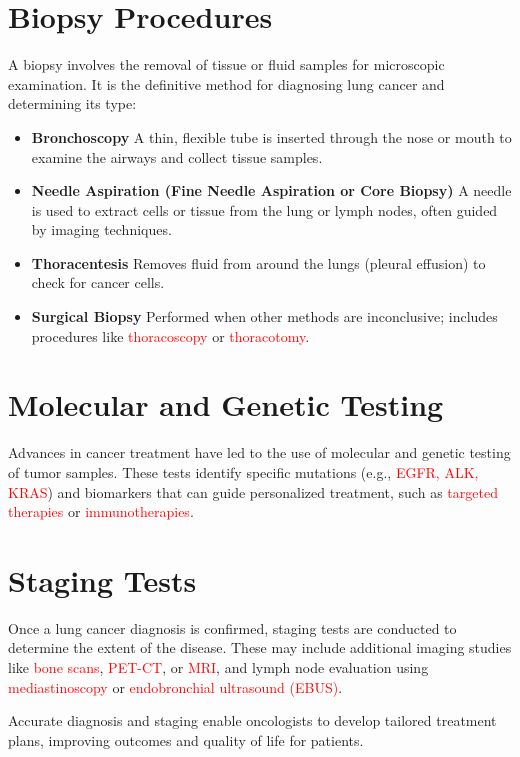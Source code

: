 \section{Biopsy Procedures} 
A biopsy involves the removal of tissue or fluid samples for microscopic examination. It is the definitive method for diagnosing lung cancer and determining its type:

\begin{highlight}
\begin{itemize}
    \item \textbf{Bronchoscopy} \cite{rozman2024interventional}A thin, flexible tube is inserted through the nose or mouth to examine the airways and collect tissue samples.
    \item \textbf{Needle Aspiration (Fine Needle Aspiration or Core Biopsy)} \cite{lee2024additional} A needle is used to extract cells or tissue from the lung or lymph nodes, often guided by imaging techniques.
    \item \textbf{Thoracentesis} \cite{dahlberg2024thoracentesis} Removes fluid from around the lungs (pleural effusion) to check for cancer cells.
    \item \textbf{Surgical Biopsy} \cite{mahuron2024applications} Performed when other methods are inconclusive; includes procedures like \textcolor{red}{thoracoscopy} or \textcolor{red}{thoracotomy}.
\end{itemize}
\end{highlight}

\section{Molecular and Genetic Testing}
\begin{outline}
Advances in cancer treatment have led to the use of molecular and genetic testing of tumor samples\cite{kanasaki2024upfront}. These tests identify specific mutations (e.g., \textcolor{red}{EGFR, ALK, KRAS}) and biomarkers that can guide personalized treatment, such as \textcolor{red}{targeted therapies} or \textcolor{red}{immunotherapies}\cite{li2024targeted}.
\end{outline}

\section{Staging Tests} 
Once a lung cancer diagnosis is confirmed, staging tests are conducted to determine the extent of the disease. These may include additional imaging studies like \textcolor{red}{bone scans}, \textcolor{red}{PET-CT}, or \textcolor{red}{MRI}, and lymph node evaluation using \textcolor{red}{mediastinoscopy} or \textcolor{red}{endobronchial ultrasound (EBUS)}\cite{de2024future}.

\begin{remark}
Accurate diagnosis and staging enable oncologists to develop tailored treatment plans, improving outcomes and quality of life for patients.
\end{remark}